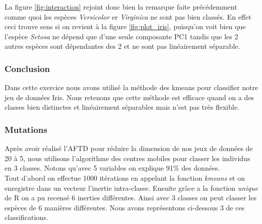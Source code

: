 \documentclass[10pt]{article}
\begin{document}
La figure \ref{fig:interaction} rejoint donc bien la remarque faite précédemment comme quoi les espèces \textit{Versicolor} er \textit{Virginica} ne sont pas bien classés. En effet ceci trouve sens si on revient à la figure \ref{fig:plot_iris}, puisqu'on voit bien que l'espèce \textit{Setosa} ne dépend que d'une seule composante PC1 tandis que les 2 autres espèces sont dépendantes des 2 et ne sont pas linéairement séparable.
\subsubsection{Conclusion}
Dans cette exercice nous avons utilisé la méthode des kmeans pour classifier notre jeu de données Iris. Nous retenons que cette méthode est efficace quand on a des classes bien distinctes et linéairement séparables mais n'est pas très flexible.

\subsubsection{Mutations}
Après avoir réalisé l'AFTD pour réduire la dimension de nos jeux de données de 20 à 5, nous utilisons l'algorithme des centres mobiles pour classer les individus en 3 classes. Notons qu'avec 5 variables on explique 91\% des données.\\
Tout d'abord on effectue 1000 itérations en appelant la fonction \textit{kmeans} et on enregistre dans un vecteur l'inertie  intra-classe. Ensuite grâce a la fonction \textit{unique} de R on a pu recensé  6 inerties différentes. Ainsi avec 3 classes on peut classer les espèces de 6 manières différentes. Nous avons représentons ci-dessous 3 de ces classifications.\\
\end{document}
